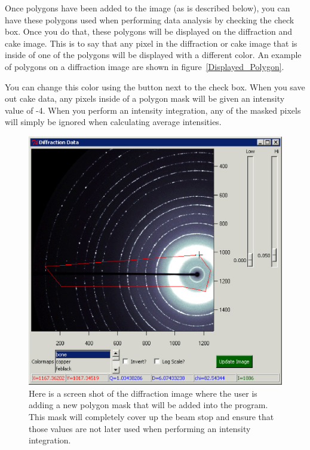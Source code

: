 Once polygons have been added to the image (as is 
described below), you can have these polygons
used when performing data analysis by checking the
 check box. Once you do that,
these polygons will be displayed on the diffraction
and cake image. This is to say that any pixel in
the diffraction or cake image that is inside of one of
the polygons will be displayed with a different color.
An example of polygons on a diffraction image are 
shown in figure~\ref{Displayed_Polygon}.

You can change this color using the  button
next to the  check box.
When you save out cake data, any pixels inside of 
a polygon mask will be given an intensity 
value of -4. When you perform an intensity integration,
any of the masked pixels will simply be ignored when
calculating average intensities.

\begin{figure}
\centering
\includegraphics[scale=.75]{figures/Adding_Polygon.eps}
\caption{Here is a screen shot of the diffraction
image where the user is adding a new polygon 
mask that will be added into the program.
This mask will completely cover up the beam stop
and ensure that those values are not later used
when performing an intensity integration.}
\label{Adding_Polygon}
\end{figure}

